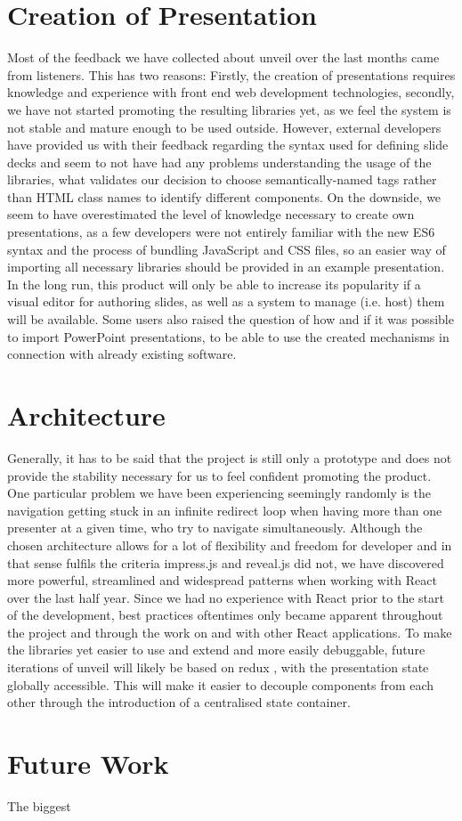 \section{Creation of Presentation}
Most of the feedback we have collected about unveil over the last months came from listeners. This has two reasons: Firstly, the creation of presentations requires knowledge and experience with front end web development technologies, secondly, we have not started promoting the resulting libraries yet, as we feel the system is not stable and mature enough to be used outside. However, external developers have provided us with their feedback regarding the syntax used for defining slide decks and seem to not have had any problems understanding the usage of the libraries, what validates our decision to choose semantically-named tags rather than HTML class names to identify different components. On the downside, we seem to have overestimated the level of knowledge necessary to create own presentations, as a few developers were not entirely familiar with the new ES6 syntax and the process of bundling JavaScript and CSS files, so an easier way of importing all necessary libraries should be provided in an example presentation.
In the long run, this product will only be able to increase its popularity if a visual editor for authoring slides, as well as a system to manage (i.e. host) them will be available. Some users also raised the question of how and if it was possible to import PowerPoint presentations, to be able to use the created mechanisms in connection with already existing software.

\section{Architecture}
Generally, it has to be said that the project is still only a prototype and does not provide the stability necessary for us to feel confident promoting the product. One particular problem we have been experiencing seemingly randomly is the navigation getting stuck in an infinite redirect loop when having more than one presenter at a given time, who try to navigate simultaneously. 
Although the chosen architecture allows for a lot of flexibility and freedom for developer and in that sense fulfils the criteria impress.js and reveal.js did not, we have discovered more powerful, streamlined and widespread patterns when working with React over the last half year. Since we had no experience with React prior to the start of the development, best practices oftentimes only became apparent throughout the project and through the work on and with other React applications. To make the libraries yet easier to use and extend and more easily debuggable, future iterations of unveil will likely be based on redux \cite{redux}, with the presentation state globally accessible. This will make it easier to decouple components from each other through the introduction of a centralised state container.

\section{Future Work}
The biggest 



